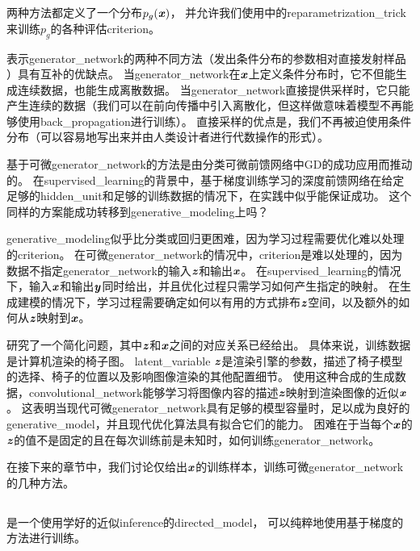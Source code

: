 两种方法都定义了一个分布$p_g(\boldsymbol{\mathit{x}})$， 并允许我们使用中的\gls{reparametrization_trick}来训练$p_g$的各种评估\gls{criterion}。


表示\gls{generator_network}的两种不同方法（发出条件分布的参数相对直接发射样品 ）具有互补的优缺点。
当\gls{generator_network}在$\boldsymbol{\mathit{x}}$上定义条件分布时，它不但能生成连续数据，也能生成离散数据。
当\gls{generator_network}直接提供采样时，它只能产生连续的数据（我们可以在前向传播中引入离散化，但这样做意味着模型不再能够使用\gls{back_propagation}进行训练）。
直接采样的优点是，我们不再被迫使用条件分布（可以容易地写出来并由人类设计者进行代数操作的形式）。

基于可微\gls{generator_network}的方法是由分类可微前馈网络中\gls{GD}的成功应用而推动的。
在\gls{supervised_learning}的背景中，基于梯度训练学习的深度前馈网络在给定足够的\gls{hidden_unit}和足够的训练数据的情况下，在实践中似乎能保证成功。
这个同样的方案能成功转移到\gls{generative_modeling}上吗？

\gls{generative_modeling}似乎比分类或回归更困难，因为学习过程需要优化难以处理的\gls{criterion}。
在可微\gls{generator_network}的情况中，\gls{criterion}是难以处理的，因为数据不指定\gls{generator_network}的输入$\boldsymbol{\mathit{z}}$和输出$\boldsymbol{\mathit{x}}$。
在\gls{supervised_learning}的情况下，输入$\boldsymbol{\mathit{x}}$和输出$\boldsymbol{\mathit{y}}$同时给出，并且优化过程只需学习如何产生指定的映射。
在生成建模的情况下，学习过程需要确定如何以有用的方式排布$\boldsymbol{\mathit{z}}$空间，以及额外的如何从$\boldsymbol{\mathit{z}}$映射到$\boldsymbol{\mathit{x}}$。

\citet{dosovitskiy2015learning}研究了一个简化问题，其中$\boldsymbol{\mathit{z}}$和$\boldsymbol{\mathit{x}}$之间的对应关系已经给出。
具体来说，训练数据是计算机渲染的椅子图。
\gls{latent_variable} $\boldsymbol{\mathit{z}}$是渲染引擎的参数，描述了椅子模型的选择、椅子的位置以及影响图像渲染的其他配置细节。
使用这种合成的生成数据，\gls{convolutional_network}能够学习将图像内容的描述$\boldsymbol{\mathit{z}}$映射到渲染图像的近似$\boldsymbol{\mathit{x}}$。
这表明当现代可微\gls{generator_network}具有足够的模型容量时，足以成为良好的\gls{generative_model}，并且现代优化算法具有拟合它们的能力。
困难在于当每个$\boldsymbol{\mathit{x}}$的$\boldsymbol{\mathit{z}}$的值不是固定的且在每次训练前是未知时，如何训练\gls{generator_network}。


在接下来的章节中，我们讨论仅给出$\boldsymbol{\mathit{x}}$的训练样本，训练可微\gls{generator_network}的几种方法。


\subsection{}
\label{sec:variational_autoencoders}
\citep{Kingma-arxiv2013,Rezende-et-al-ICML2014}是一个使用学好的近似\gls{inference}的\gls{directed_model}， 可以纯粹地使用基于梯度的方法进行训练。


